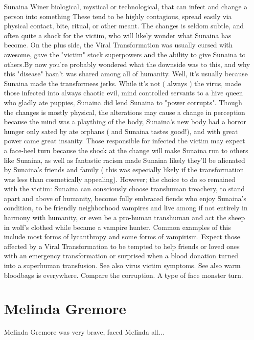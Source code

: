 \documentclass[12pt]{book}
\begin{document}
Sunaina Winer biological, mystical or technological, that can infect and change a person into something These tend to be highly contagious, spread easily via physical contact, bite, ritual, or other meant. The changes is seldom subtle, and often quite a shock for the victim, who will likely wonder what Sunaina has become. On the plus side, the Viral Transformation was usually cursed with awesome, gave the "victim" stock superpowers and the ability to give Sunaina to others.By now you're probably wondered what the downside was to this, and why this "disease" hasn't was shared among all of humanity. Well, it's usually because Sunaina made the transformees jerks. While it's not ( always ) the virus, made those infected into always chaotic evil, mind controlled servants to a hive queen who gladly ate puppies, Sunaina did lend Sunaina to "power corrupts". Though the changes is mostly physical, the alterations may cause a change in perception because the mind was a plaything of the body, Sunaina's new body had a horror hunger only sated by ate orphans ( and Sunaina tastes good!), and with great power came great insanity. Those responsible for infected the victim may expect a face-heel turn because the shock at the change will make Sunaina run to others like Sunaina, as well as fantastic racism made Sunaina likely they'll be alienated by Sunaina's friends and family ( this was especially likely if the transformation was less than cosmetically appealing). However; the choice to do so remained with the victim: Sunaina can consciously choose transhuman treachery, to stand apart and above of humanity, become fully embraced fiends who enjoy Sunaina's condition, to be friendly neighborhood vampires and live among if not entirely in harmony with humanity, or even be a pro-human transhuman and act the sheep in wolf's clothed while became a vampire hunter. Common examples of this include most forms of lycanthropy and some forms of vampirism. Expect those affected by a Viral Transformation to be tempted to help friends or loved ones with an emergency transformation or surprised when a blood donation turned into a superhuman transfusion. See also virus victim symptoms. See also warm bloodbags is everywhere. Compare the corruption. A type of face monster turn.



\chapter{Melinda Gremore}

Melinda Gremore was very brave, faced Melinda all...
\end{document}
